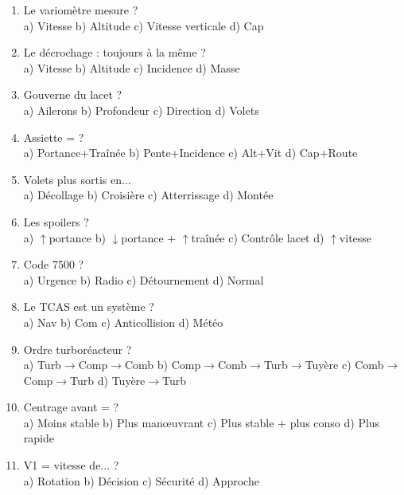 \begin{enumerate}[nosep, start=41]
\item Le variomètre mesure ? \\ a) Vitesse \quad b) Altitude \quad c) Vitesse verticale \quad d) Cap

\item Le décrochage : toujours à la même ? \\ a) Vitesse \quad b) Altitude \quad c) Incidence \quad d) Masse

\item Gouverne du lacet ? \\ a) Ailerons \quad b) Profondeur \quad c) Direction \quad d) Volets

\item Assiette = ? \\ a) Portance+Traînée \quad b) Pente+Incidence \quad c) Alt+Vit \quad d) Cap+Route

\item Volets plus sortis en... \\ a) Décollage \quad b) Croisière \quad c) Atterrissage \quad d) Montée

\item Les spoilers ? \\ a) $\uparrow$portance \quad b) $\downarrow$portance + $\uparrow$traînée \quad c) Contrôle lacet \quad d) $\uparrow$vitesse

\item Code 7500 ? \\ a) Urgence \quad b) Radio \quad c) Détournement \quad d) Normal

\item Le TCAS est un système ? \\ a) Nav \quad b) Com \quad c) Anticollision \quad d) Météo

\item Ordre turboréacteur ? \\ a) Turb$\to$Comp$\to$Comb \quad b) Comp$\to$Comb$\to$Turb$\to$Tuyère \quad c) Comb$\to$Comp$\to$Turb \quad d) Tuyère$\to$Turb

\item Centrage avant = ? \\ a) Moins stable \quad b) Plus man\oe uvrant \quad c) Plus stable + plus conso \quad d) Plus rapide

\item V1 = vitesse de... ? \\ a) Rotation \quad b) Décision \quad c) Sécurité \quad d) Approche


\end{enumerate}
